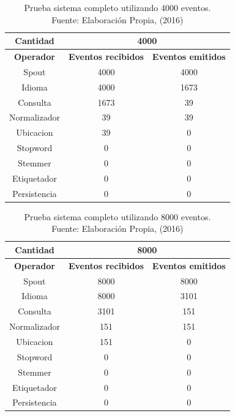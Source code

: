 \begin{table}[H]
\centering
\caption[Prueba sistema completo utilizando 4000 eventos.]{Prueba sistema completo utilizando 4000 eventos.\\Fuente: Elaboración Propia, (2016)}
\label{PruebaSistFull4000}
\begin{tabular}{|c|c|c|}
\hline
\textbf{Cantidad} & \multicolumn{2}{c|}{\textbf{4000}} \\ \hline
\textbf{Operador} & \multicolumn{1}{c|}{\textbf{Eventos recibidos}} & \multicolumn{1}{c|}{\textbf{Eventos emitidos}} \\ \hline
Spout & 4000 & 4000 \\ \hline
Idioma & 4000 & 1673 \\ \hline
Consulta & 1673 & 39 \\ \hline
Normalizador & 39 & 39 \\ \hline
Ubicacion & 39 & 0 \\ \hline
Stopword & 0 & 0 \\ \hline
Stemmer & 0 & 0 \\ \hline
Etiquetador & 0 & 0 \\ \hline
Persistencia & 0 & 0 \\ \hline
\end{tabular}
\end{table}

\begin{table}[H]
\centering
\caption[Prueba sistema completo utilizando 8000 eventos.]{Prueba sistema completo utilizando 8000 eventos.\\Fuente: Elaboración Propia, (2016)}
\label{PruebaSistFull8000}
\begin{tabular}{|c|c|c|}
\hline
\textbf{Cantidad} & \multicolumn{2}{c|}{\textbf{8000}} \\ \hline
\textbf{Operador} & \multicolumn{1}{c|}{\textbf{Eventos recibidos}} & \multicolumn{1}{c|}{\textbf{Eventos emitidos}} \\ \hline
Spout & 8000 & 8000 \\ \hline
Idioma & 8000 & 3101 \\ \hline
Consulta & 3101 & 151 \\ \hline
Normalizador & 151 & 151 \\ \hline
Ubicacion & 151 & 0 \\ \hline
Stopword & 0 & 0 \\ \hline
Stemmer & 0 & 0 \\ \hline
Etiquetador & 0 & 0 \\ \hline
Persistencia & 0 & 0 \\ \hline
\end{tabular}
\end{table}


